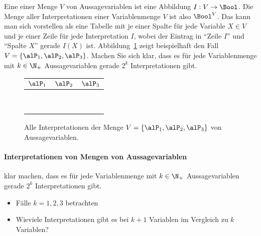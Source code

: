 Eine  einer Menge $V$
von Aussagevariablen ist eine Abbildung $I: V \to \Bool$.
%
Die Menge aller Interpretationen einer Variablenmenge $V$ ist also
$\Bool^V$.
%
Das kann man sich \zB vorstellen als eine Tabelle mit je einer Spalte
für jede Variable $X\in V$ und je einer Zeile für jede Interpretation
$I$, wobei der Eintrag in "`Zeile $I$"' und "`Spalte $X$"' gerade
$I(X)$ ist. Abbildung~\ref{fig:tab-alle-interpretationen} zeigt
beispielhaft den Fall $V=\{\alP_1, \alP_2, \alP_3\}$.
%
Machen Sie sich klar, dass es für jede Variablenmenge mit $k\in\N_+$
Aussagevariablen gerade $2^k$ Interpretationen gibt.
%
\begin{figure}[ht]
  \centering
  \begin{tabular}{*{3}{c}}
    \toprule
    $\alP_1$ & $\alP_2$ & $\alP_3$ \\
    \midrule
    \F & \F & \F \\
    \F & \F & \W \\
    \F & \W & \F \\
    \F & \W & \W \\
    \W & \F & \F \\
    \W & \F & \W \\
    \W & \W & \F \\
    \W & \W & \W \\
    \bottomrule
  \end{tabular}
  \caption{Alle Interpretationen der Menge $V=\{\alP_1, \alP_2, \alP_3\}$ von Aussagevariablen.}
  \label{fig:tab-alle-interpretationen}
\end{figure}
%
\begin{tutorium}
  \paragraph{Interpretationen von Mengen von Aussagevariablen}

  klar machen, dass es für jede Variablenmenge mit $k\in\N_+$
  Aussagevariablen gerade $2^k$ Interpretationen gibt.
  \begin{itemize}
  \item Fälle $k=1,2,3$ betrachten
  \item Wieviele Interpretationen gibt es bei $k+1$ Variablen im
    Vergleich zu $k$ Variablen?
  \end{itemize}
\end{tutorium}

